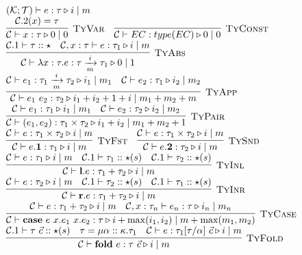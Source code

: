 \documentclass[fleqn]{article}
\begin{document}
\[
\begin{array}{l}
	(\mathcal{K}; \mathcal{T}) \vdash e : \tau \triangleright i \mid m \\
	\infer[\textsc{TyVar}]{\mathcal{C} \vdash x : \tau \triangleright 0 \mid 0}{\mathcal{C}.2(x)=\tau} \hspace{1em}
	\infer[\textsc{TyConst}]{\mathcal{C} \vdash EC : type(EC) \triangleright 0 \mid 0}{} \\
	\infer[\textsc{TyAbs}]{\mathcal{C} \vdash \lambda x:\tau. e : \tau \xrightarrow[m]{i} \tau_1 \triangleright 0 \mid 1}{\mathcal{C}.1 \vdash \tau :: \star & \mathcal{C},x:\tau \vdash e : \tau_1 \triangleright i \mid m} \\
	\infer[\textsc{TyApp}]{\mathcal{C} \vdash e_1~e_2 : \tau_2 \triangleright i_1 + i_2 + 1 + i \mid m_1 + m_2 + m}{\mathcal{C} \vdash e_1 : \tau_1 \xrightarrow[m]{i} \tau_2 \triangleright i_1 \mid m_1 & \mathcal{C} \vdash e_2 : \tau_1 \triangleright i_2 \mid m_2} \\
	\infer[\textsc{TyPair}]{\mathcal{C} \vdash (e_1,e_2) : \tau_1 \times \tau_2 \triangleright i_1 + i_2 \mid m_1 + m_2 + 1}{\mathcal{C} \vdash e_1 : \tau_1 \triangleright i_1 \mid m_1 & \mathcal{C} \vdash e_2 : \tau_2 \triangleright i_2 \mid m_2} \\
	\infer[\textsc{TyFst}]{\mathcal{C} \vdash e.\mathbf{1} : \tau_1 \triangleright i \mid m}{\mathcal{C} \vdash e : \tau_1 \times \tau_2 \triangleright i \mid m} \hspace{1em}
	\infer[\textsc{TySnd}]{\mathcal{C} \vdash e.\mathbf{2} : \tau_2 \triangleright i \mid m}{\mathcal{C} \vdash e : \tau_1 \times \tau_2 \triangleright i \mid m} \\
	\infer[\textsc{TyInl}]{\mathcal{C} \vdash \mathbf{l}.e : \tau_1 + \tau_2 \triangleright i \mid m}{\mathcal{C} \vdash e : \tau_1 \triangleright i \mid m & \mathcal{C}.1 \vdash \tau_1 :: \star(s) & \mathcal{C}.1 \vdash \tau_2 :: \star(s)} \\
	\infer[\textsc{TyInr}]{\mathcal{C} \vdash \mathbf{r}.e : \tau_1 + \tau_2 \triangleright i \mid m}{\mathcal{C} \vdash e : \tau_2 \triangleright i \mid m & \mathcal{C}.1 \vdash \tau_2 :: \star(s) & \mathcal{C}.1 \vdash \tau_1 :: \star(s)} \\
	\infer[\textsc{TyCase}]{\mathcal{C} \vdash \mathbf{case}~e~x.e_1~x.e_2 : \tau \triangleright i + \max(i_1,i_2) \mid m + \max(m_1,m_2)}{\mathcal{C} \vdash e : \tau_1 + \tau_2 \triangleright i \mid m & \mathcal{C},x:\tau_n \vdash e_n : \tau \triangleright i_n \mid m_n} \\
	\infer[\textsc{TyFold}]{\mathcal{C} \vdash \mathbf{fold}~e : \tau~\vec{c} \triangleright i \mid m}{\mathcal{C}.1 \vdash \tau~\vec{c} :: \star(s) & \tau = \mu \alpha :: \kappa. \tau_1 & \mathcal{C} \vdash e : \tau_1[\tau/\alpha]~\vec{c} \triangleright i \mid m} \\

\end{array}\]
\end{document}
